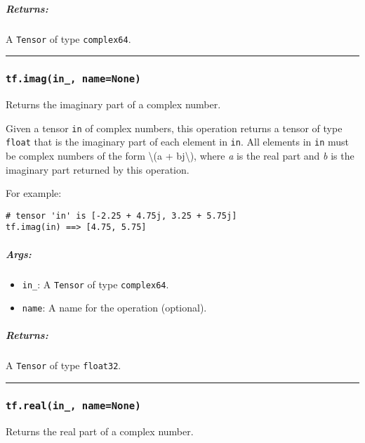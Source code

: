 \subparagraph{Returns: }\label{returns-35}

A \texttt{Tensor} of type \texttt{complex64}.

\begin{center}\rule{0.5\linewidth}{\linethickness}\end{center}

\subsubsection{\texorpdfstring{\texttt{tf.imag(in\_,\ name=None)}
}{tf.imag(in\_, name=None) }}\label{tf.imaginux5f-namenone}

Returns the imaginary part of a complex number.

Given a tensor \texttt{in} of complex numbers, this operation returns a
tensor of type \texttt{float} that is the imaginary part of each element
in \texttt{in}. All elements in \texttt{in} must be complex numbers of
the form \textbackslash{}(a + bj\textbackslash{}), where \emph{a} is the
real part and \emph{b} is the imaginary part returned by this operation.

For example:

\begin{verbatim}
# tensor 'in' is [-2.25 + 4.75j, 3.25 + 5.75j]
tf.imag(in) ==> [4.75, 5.75]
\end{verbatim}

\subparagraph{Args: }\label{args-36}

\begin{itemize}
\tightlist
\item
  \texttt{in\_}: A \texttt{Tensor} of type \texttt{complex64}.
\item
  \texttt{name}: A name for the operation (optional).
\end{itemize}

\subparagraph{Returns: }\label{returns-36}

A \texttt{Tensor} of type \texttt{float32}.

\begin{center}\rule{0.5\linewidth}{\linethickness}\end{center}

\subsubsection{\texorpdfstring{\texttt{tf.real(in\_,\ name=None)}
}{tf.real(in\_, name=None) }}\label{tf.realinux5f-namenone}

Returns the real part of a complex number.

